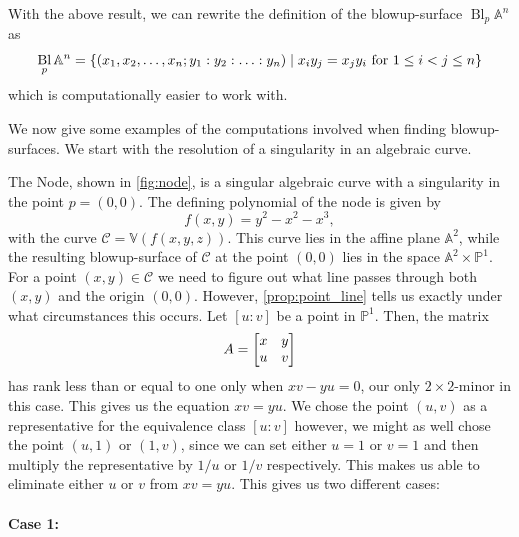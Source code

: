 \documentclass{article}
\newcommand{\A}{\ensuremath{\mathbb{A}}}
\newcommand{\V}{\ensuremath{\mathbb{V}}}
\renewcommand{\P}{\ensuremath{\mathbb{P}}}
\DeclareMathOperator{\Bl}{Bl}
\begin{document}
    With the above result, we can rewrite the definition of the blowup-surface
    $\Bl_p\A^n$ as
    \begin{equation}
        \notag
        \Bl_p\A^n = \left\{ (x_1, x_2, \ldots, x_n; y_1 : y_2 : \ldots : y_n)
    \mid x_iy_j = x_jy_i \text{ for } 1 \leq i < j \leq n \right\}
    \end{equation} which is computationally easier to work with.

    We now give some examples of the computations involved when finding
    blowup-surfaces. We start with the resolution of a singularity in an
    algebraic curve.
    \begin{example}
        The Node, shown in \cref{fig:node}, is a singular algebraic curve with
        a singularity in the point $p = (0, 0)$. The defining polynomial of the
        node is given by
        \begin{equation}
            \label{eq:node}
            f(x, y) = y^2 - x^2 - x^3,
        \end{equation}
        with the curve $\mathcal{C} = \V(f(x, y, z))$. This curve lies in the
        affine plane $\A^2$, while the resulting blowup-surface of
        $\mathcal{C}$ at the point $(0, 0)$ lies in the space $\A^2 \times
        \P^1$. For a point $(x, y) \in \mathcal{C}$ we need to figure out what
        line passes through both $(x, y)$ and the origin $(0, 0)$. However,
        \cref{prop:point_line} tells us exactly under what circumstances this
        occurs. Let $[u : v]$ be a point in $\P^1$. Then, the matrix
        \begin{equation}
            \notag
            A = \begin{bmatrix}
                x & y \\
                u & v
            \end{bmatrix}
        \end{equation}
        has rank less than or equal to one only when $xv - yu = 0$, our only
        $2\times 2$-minor in this case. This gives us the equation $xv = yu$.
        We chose the point $(u, v)$ as a representative for the equivalence
        class $[u : v]$ however, we might as well chose the point $(u, 1)$ or
        $(1, v)$, since we can set either $u = 1$ or $v = 1$ and then multiply
        the representative by $1 / u$ or $1 / v$ respectively. This makes us
        able to eliminate either $u$ or $v$ from $xv = yu$. This gives us two
        different cases:
    
        \paragraph{Case 1:}
        \label{par:case_1}
        

\end{example}
\end{document}
